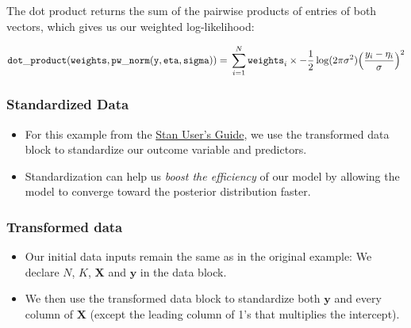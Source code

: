 \documentclass[
  11pt,
]{article}
\providecommand{\tightlist}{%
  \setlength{\itemsep}{0pt}\setlength{\parskip}{0pt}}
\begin{document}
The dot product returns the sum of the pairwise products of entries of both vectors, which gives us our weighted log-likelihood:

\[\mathtt{dot\_product(weights, pw\_norm(y, eta, sigma))} = \\ \sum_{i=1}^{N}\mathtt{weights}_i \times -\frac{1}{2} \log (2 \pi \sigma^2) \Big( \frac{y_i-\eta_i}{\sigma}\Big)^2\]

\hypertarget{standardized-data}{%
\subsubsection{Standardized Data}\label{standardized-data}}

\begin{itemize}
\tightlist
\item
  For this example from the \href{https://mc-stan.org/docs/2_19/stan-users-guide/standardizing-predictors-and-outputs.html}{Stan User's Guide}, we use the transformed data block to standardize our outcome variable and predictors.
\item
  Standardization can help us \emph{boost the efficiency} of our model by allowing the model to converge toward the posterior distribution faster.
\end{itemize}

\hypertarget{transformed-data}{%
\subsubsection{Transformed data}\label{transformed-data}}

\begin{itemize}
\tightlist
\item
  Our initial data inputs remain the same as in the original example: We declare \(N\), \(K\), \(\mathbf{X}\) and \(\mathbf{y}\) in the data block.
\item
  We then use the transformed data block to standardize both \(\mathbf{y}\) and every column of \(\mathbf{X}\) (except the leading column of 1's that multiplies the intercept).
\end{itemize}
\end{document}
